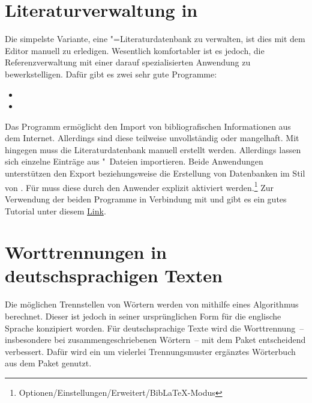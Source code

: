\section{Literaturverwaltung in }
%
Die simpelste Variante, eine "=Literaturdatenbank zu verwalten, 
ist dies mit dem Editor manuell zu erledigen. Wesentlich komfortabler ist es 
jedoch, die Referenzverwaltung mit einer darauf spezialisierten Anwendung zu 
bewerkstelligen. Dafür gibt es zwei sehr gute Programme:
%
\begin{itemize}
\item {}
\item {}
\end{itemize}
%
Das Programm  ermöglicht den Import von bibliografischen 
Informationen aus dem Internet. Allerdings sind diese teilweise unvollständig 
oder mangelhaft. Mit  hingegen muss die Literaturdatenbank 
manuell erstellt werden. Allerdings lassen sich einzelne Einträge aus 
"~Dateien importieren. Beide Anwendungen unterstützen den Export 
beziehungsweise die Erstellung von Datenbanken im Stil von . 
Für  muss diese durch den Anwender explizit aktiviert 
werden.\footnote{Optionen/Einstellungen/Erweitert/BibLaTeX-Modus} 
Zur Verwendung der beiden Programme in Verbindung mit  und 
 gibt es ein gutes Tutorial unter diesem
\href{http://www.suedraum.de/latex/stammtisch/degenkolb_latex_biblatex_folien-final.pdf}{Link}.



\section{Worttrennungen in deutschsprachigen Texten}
%
Die möglichen Trennstellen von Wörtern werden von  mithilfe 
eines Algorithmus berechnet. Dieser ist jedoch in seiner ursprünglichen Form 
für die englische Sprache konzipiert worden. Für deutschsprachige Texte wird 
die Worttrennung~-- insbesondere bei zusammengeschriebenen Wörtern~-- mit dem 
Paket  entscheidend verbessert. Dafür wird ein um vielerlei 
Trennungsmuster ergänztes Wörterbuch aus dem Paket  
genutzt. 

